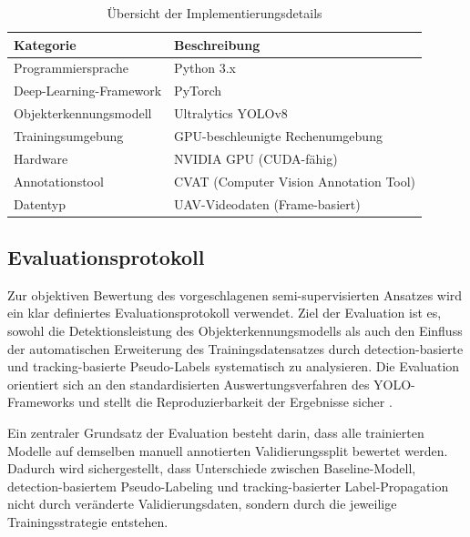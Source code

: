 \begin{table}[H]
    \centering
    \caption{Übersicht der Implementierungsdetails}
    \label{tab:implementation_details}
    \begin{tabular}{ll}
        \hline
        \textbf{Kategorie}      & \textbf{Beschreibung}                  \\
        \hline
        Programmiersprache      & Python 3.x                             \\
        Deep-Learning-Framework & PyTorch                                \\
        Objekterkennungsmodell  & Ultralytics YOLOv8                     \\
        Trainingsumgebung       & GPU-beschleunigte Rechenumgebung       \\
        Hardware                & NVIDIA GPU (CUDA-fähig)                \\
        Annotationstool         & CVAT (Computer Vision Annotation Tool) \\
        Datentyp                & UAV-Videodaten (Frame-basiert)         \\
        \hline
    \end{tabular}
\end{table}

\subsection{Evaluationsprotokoll}

Zur objektiven Bewertung des vorgeschlagenen semi-supervisierten Ansatzes wird ein
klar definiertes Evaluationsprotokoll verwendet. Ziel der Evaluation ist es, sowohl
die Detektionsleistung des Objekterkennungsmodells als auch den Einfluss der
automatischen Erweiterung des Trainingsdatensatzes durch detection-basierte und
tracking-basierte Pseudo-Labels systematisch zu analysieren. Die Evaluation
orientiert sich an den standardisierten Auswertungsverfahren des YOLO-Frameworks
und stellt die Reproduzierbarkeit der Ergebnisse sicher \cite{ultralytics2024}.

Ein zentraler Grundsatz der Evaluation besteht darin, dass alle trainierten Modelle
auf demselben manuell annotierten Validierungssplit bewertet werden. Dadurch
wird sichergestellt, dass Unterschiede zwischen Baseline-Modell, detection-basiertem
Pseudo-Labeling und tracking-basierter Label-Propagation nicht durch veränderte
Validierungsdaten, sondern durch die jeweilige Trainingsstrategie entstehen.

